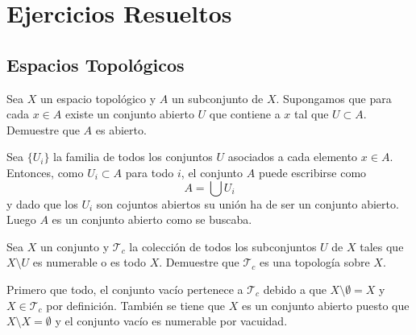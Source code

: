 \chapter*{Ejercicios Resueltos}

\section{Espacios Topológicos}

\begin{ejer} Sea $ X $ un espacio topológico y $ A $ un
	subconjunto de $ X $.  Supongamos que para cada
	$ x\in A $ existe un conjunto abierto $ U $ que
	contiene a $ x $ tal que $ U\subset A $.
	Demuestre que $ A $ es abierto.  \end{ejer}

\begin{sol} Sea $ \{ U_i \} $ la familia de todos los
	conjuntos $ U $ asociados a cada elemento $x\in
	A$. Entonces, como $ U_i\subset A $ para todo $
	i $, el conjunto $ A $ puede escribirse como \[
	A=\bigcup U_i \] y dado que los $ U_i $ son
	cojuntos abiertos su unión ha de ser un
	conjunto abierto. Luego $ A $ es un conjunto
	abierto como se buscaba.  \end{sol}

\begin{ejer} Sea $ X $ un conjunto y $ \mathcal{T}_c$
	la colección de todos los subconjuntos $ U $ de
	$ X $ tales que $ X\setminus U $ es numerable o
	es todo $ X $. Demuestre que $ \mathcal{T}_c $
	es una topología sobre $ X $.  \end{ejer}

\begin{sol} Primero que todo, el conjunto vacío
	pertenece a $ \mathcal{T}_c $ debido a que $
	X\setminus\emptyset=X $ y $X\in \mathcal{T}_c$
	por definición. También se tiene que $ X $ es
	un conjunto abierto puesto que $ X\setminus
	X=\emptyset $ y el conjunto vacío es numerable
	por vacuidad.  \end{sol} 
